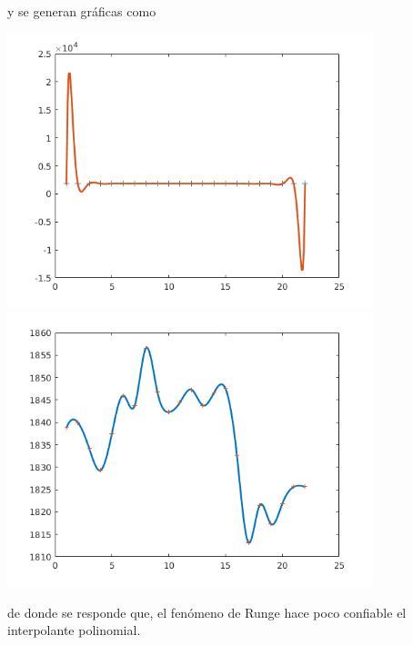 y se generan gr\'aficas como
\begin{center}
\includegraphics[width=0.8\textwidth]{./cencosud.png}
\includegraphics[width=0.8\textwidth]{./cencosud_spline.png}
\end{center}
de donde se responde que, el fen\'omeno de Runge hace poco confiable el interpolante polinomial.

\hfill{}